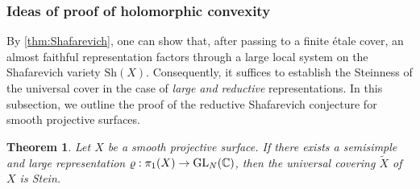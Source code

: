\documentclass[english]{amsproc}
\theoremstyle{plain}
\newtheorem{thm}{Theorem}[section]
\theoremstyle{definition}
\theoremstyle{remark}
\theoremstyle{plain}
\numberwithin{equation}{thm} %
\newcommand{\bC}{\mathbb{C}}
\newcommand{\GL}{{\rm GL}}
\begin{document}
\subsubsection{Ideas of proof of holomorphic convexity}
By \cref{thm:Shafarevich}, one can show that, after passing to a finite étale cover, an almost 
faithful representation factors through a large local system on the Shafarevich variety 
\(\mathrm{Sh}(X)\). 
Consequently, it suffices to establish the Steinness of the universal cover in the case of 
\emph{large and reductive} representations.  
In this subsection, we outline the proof of the reductive Shafarevich conjecture for smooth 
projective surfaces.
\begin{thm}
	Let $X$ be a smooth projective surface. If there exists a semisimple and  large representation $\varrho:\pi_1(X)\to \GL_{N}(\bC)$, then the universal covering $\widetilde{X}$ of $X$ is Stein.
\end{thm}
\end{document}
